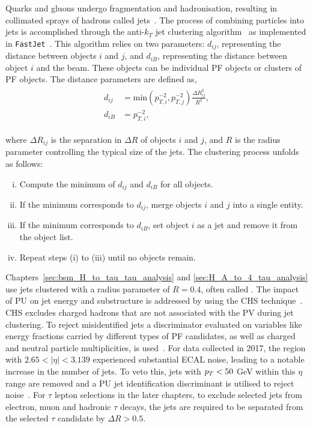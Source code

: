 Quarks and gluons undergo fragmentation and hadronisation, resulting in collimated sprays of hadrons called jets~\cite{Salam:2010nqg}. 
The process of combining particles into jets is accomplished through the anti-$k_T$ jet clustering algorithm~\cite{Cacciari:2008gp} as implemented in \texttt{FastJet}~\cite{Cacciari:2011ma}. 
This algorithm relies on two  parameters: $d_{ij}$, representing the distance between objects $i$ and $j$, and $d_{iB}$, representing the distance between object $i$ and the beam. 
These objects can be individual \ac{PF} objects or clusters of \ac{PF} objects. 
The distance parameters are defined as,
\begin{align}
\begin{split}
d_{ij} &= \text{min}(p_{T,i}^{-2}, p_{T,j}^{-2})  \frac{\Delta R_{ij}^{2}}{R^{2}}, \\ 
d_{iB} &= p_{T,i}^{-2}, 
\end{split}
\end{align} 
 
where $\Delta R_{ij}$ is the separation in $\Delta R$ of objects $i$ and $j$, and $R$ is the radius parameter controlling the typical size of the jets. 
The clustering process unfolds as follows:

\begin{enumerate}[i)]
\item Compute the minimum of $d_{ij}$ and $d_{iB}$ for all objects.
\item If the minimum corresponds to $d_{ij}$, merge objects $i$ and $j$ into a single entity.
\item If the minimum corresponds to $d_{iB}$, set object $i$ as a jet and remove it from the object list.
\item Repeat steps (i) to (iii) until no objects remain. 
\end{enumerate}

Chapters~\ref{sec:bsm_H_to_tau_tau_analysis} and \ref{sec:H_A_to_4_tau_analysis} use jets clustered with a radius parameter of $R = 0.4$, often called .
The impact of \ac{PU} on jet energy and substructure is addressed by using the \ac{CHS} technique~\cite{CMS:2017wyc}. 
\ac{CHS} excludes charged hadrons that are not associated with the \ac{PV} during jet clustering. 
To reject misidentified jets a discriminator evaluated on variables like energy fractions carried by different types of \ac{PF} candidates, as well as charged and neutral particle multiplicities, is used~\cite{CMS:2017wyc}. 
For data collected in 2017, the region with $2.65 < |\eta| < 3.139$ experienced substantial \ac{ECAL} noise, leading to a notable increase in the number of jets. 
To veto this, jets with $p_{T} < 50$ GeV within this $\eta$ range are removed and a \ac{PU} jet identification discriminant is utilised to reject noise~\cite{CMS:2013wea}.
For $\tau$ lepton selections in the later chapters, to exclude selected jets from electron, muon and hadronic $\tau$ decays, the jets are required to be separated from the selected $\tau$ candidate by $\Delta R > 0.5$.

